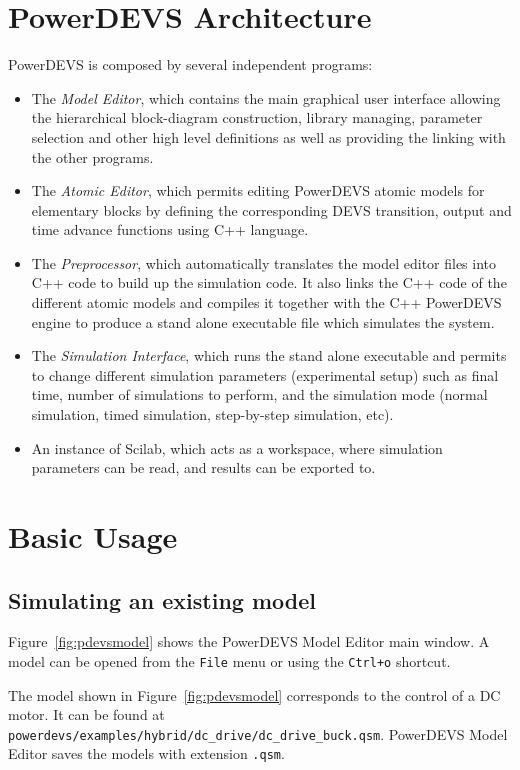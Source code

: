 \section{PowerDEVS Architecture}
PowerDEVS is composed by several independent programs:
\begin{itemize}
  \item The {\it Model Editor}, which contains the main graphical user interface allowing the hierarchical block-diagram construction, library managing, parameter selection and other high level definitions as well as providing the linking with the other programs.

  \item The {\it Atomic Editor}, which permits editing PowerDEVS atomic models for elementary blocks by defining the corresponding DEVS transition, output and time advance functions using C++ language.

  \item The {\it Preprocessor}, which automatically translates the model editor files into C++ code to build up the simulation code. It also links the C++ code of the different atomic models and compiles it together with the C++ PowerDEVS engine to produce a stand alone executable file which simulates the system.

   \item The {\it Simulation Interface}, which runs the stand alone executable and permits to change different simulation parameters (experimental setup) such as final time, number of simulations to perform, and the simulation mode (normal simulation, timed simulation, step-by-step simulation, etc).

   \item An instance of Scilab, which acts as a workspace, where simulation parameters can be read, and results can be exported to.
\end{itemize}

\section{Basic Usage}
\subsection*{Simulating an existing model}
Figure~\ref{fig:pdevsmodel} shows the PowerDEVS Model Editor main window. A model can be opened from the \verb"File" menu or using the \verb"Ctrl+o" shortcut.

The model shown in Figure~\ref{fig:pdevsmodel} corresponds to the control of a DC motor. It can be found at \verb"powerdevs/examples/hybrid/dc_drive/dc_drive_buck.qsm". PowerDEVS Model Editor saves the models with extension \verb".qsm".


